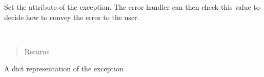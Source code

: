 \documentclass[letterpaper,10pt,english]{sphinxmanual}
\begin{document}
\begin{fulllineitems}
\begin{quote}
\begin{description}
\end{description}\end{quote}

Set the  attribute of the exception. The error handler can then 
check this value to decide how to convey the error to the user.

\begin{fulllineitems}
\label{\detokenize{tiger_leagues/models/readme:tiger_leagues.models.exception.TigerLeaguesException.to_dict}}~\begin{quote}\begin{description}
\item[{Returns}] \leavevmode
{}

\end{description}\end{quote}

A dict representation of the exception

\end{fulllineitems}


\end{fulllineitems}

\end{document}
